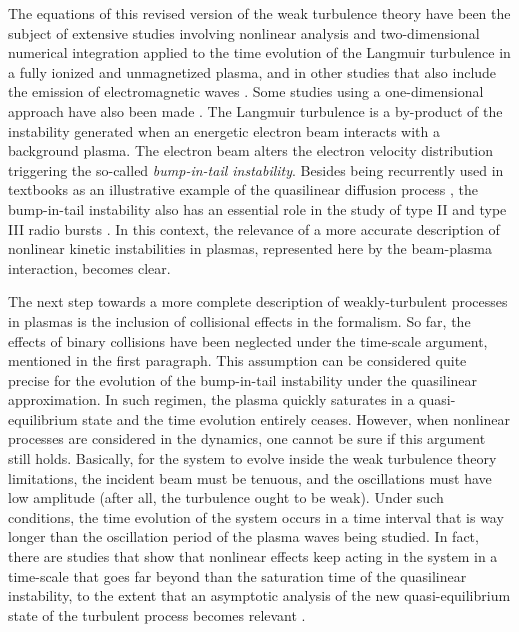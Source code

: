 \documentclass[12pt,a4paper,ruledheader]{report}
\begin{document}
The equations of this revised version of the weak turbulence theory
have been the subject of extensive studies involving nonlinear analysis
and two-dimensional numerical integration applied to the time evolution
of the Langmuir turbulence \cite{ZGPY08,Ziebell2012,YZGLW12,
  ZYGP14a,ZYGP14b} in a fully ionized and unmagnetized plasma, and in
other studies that also include the emission of electromagnetic waves
\cite{ZYSGP14c,ZYPGP15,ZPYGP16}. Some studies using a one-dimensional
approach have also been made \cite{ZiebellGY01,GaelzerZY02,GZVYR08}.
The Langmuir turbulence is a by-product  of the instability generated
when an energetic electron beam interacts with a background plasma. The
electron beam alters the electron velocity distribution triggering the
so-called \emph{bump-in-tail instability}. Besides being recurrently used
in textbooks as an illustrative example of the quasilinear diffusion process
\cite{akhi2,chen,gurnett2017}, the bump-in-tail instability also has an
essential role in the study of type II and type III radio bursts
\cite{Emslie1984,Hannah2009,ZVST11,Hannah2011,KK12,RR14,BNKR14}. In this
context, the relevance of a more accurate description of nonlinear kinetic
instabilities in plasmas, represented here by the beam-plasma interaction,
becomes clear.

The next step towards a more complete description of weakly-turbulent
processes in plasmas is the inclusion of collisional effects in the
formalism. So far, the effects of binary collisions have been neglected
under the time-scale argument, mentioned in the first paragraph. This
assumption can be considered quite precise for the evolution of the
bump-in-tail instability under the quasilinear approximation. In such
regimen, the plasma quickly saturates in a quasi-equilibrium state and
the time evolution entirely ceases. However, when nonlinear processes
are considered in the dynamics, one cannot be sure if this argument
still holds. Basically, for the system to evolve inside the weak
turbulence theory limitations, the incident beam must be tenuous, and
the oscillations must have low amplitude (after all, the turbulence
ought to be weak). Under such conditions, the time evolution of the
system occurs in a time interval that is way longer than the oscillation
period of the plasma waves being studied. In fact, there are studies that
show that nonlinear effects keep acting in the system in a time-scale that
goes far beyond than the saturation time of the quasilinear instability,
to the extent that an asymptotic analysis of the new quasi-equilibrium
state of the turbulent process becomes relevant \cite{Yoon2012c,ZYGP14a,
  ZYGP14b,ZYSGP14c,ZYPGP15}.
\end{document}

